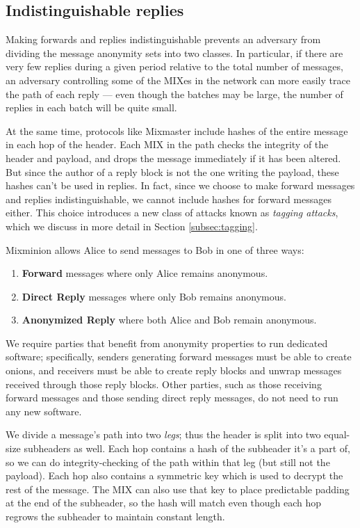 \documentclass{llncs}
\begin{document}
\subsection{Indistinguishable replies}
\label{subsec:header-swap}

Making forwards and replies indistinguishable prevents an adversary from
dividing the message anonymity sets into two classes. In particular, if
there are very few replies during a given period relative to the total
number of messages, an adversary controlling some of the MIXes in the
network can more easily trace the path of each reply --- even though
the batches may be large, the number of replies in each batch will be
quite small.

At the same time, protocols like Mixmaster include hashes of the entire
message in each hop of the header. Each MIX in the path checks the
integrity of the header and payload, and drops the message immediately
if it has been altered. But since the author of a reply block is not the
one writing the payload, these hashes can't be used in replies. In fact,
since we choose to make forward messages and replies indistinguishable,
we cannot include hashes for forward messages either. This choice
introduces a new class of attacks known as \emph{tagging attacks},
which we discuss in more detail in Section \ref{subsec:tagging}.

Mixminion allows Alice to send messages to Bob in one of three ways:

\begin{enumerate}
\item \textbf{Forward} messages where only Alice remains anonymous.
\item \textbf{Direct Reply} messages where only Bob remains anonymous.
\item \textbf{Anonymized Reply} where both Alice and Bob remain anonymous.
\end{enumerate}

We require parties that benefit from anonymity properties to run dedicated
software; specifically, senders generating forward messages must be able
to create onions, and receivers must be able to create reply blocks
and unwrap messages received through those reply blocks. Other parties,
such as those receiving forward messages and those sending direct reply
messages, do not need to run any new software.

We divide a message's path into two \emph{legs}; thus the header is
split into two equal-size subheaders as well. Each hop contains a hash
of the subheader it's a part of, so we can do integrity-checking of the
path within that leg (but still not the payload). Each hop also contains
a symmetric key which is used to decrypt the rest of the message. The
MIX can also use that key to place predictable padding at the end of
the subheader, so the hash will match even though each hop regrows the
subheader to maintain constant length.
\end{document}
